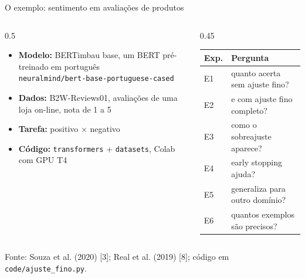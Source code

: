 \documentclass[aspectratio=169,10pt]{beamer}
\newcommand{\fonte}[1]{\par\vfill{\scriptsize\color{tinta2}Fonte: #1}}
\begin{document}
\begin{frame}{O exemplo: sentimento em avaliações de produtos}
  \begin{columns}[T]
    \begin{column}{0.5\textwidth}
      \begin{itemize}
        \item \textbf{Modelo:} BERTimbau base, um BERT pré-treinado em português\\ {\scriptsize\texttt{neuralmind/bert-base-portuguese-cased}}
        \item \textbf{Dados:} B2W-Reviews01, avaliações de uma loja on-line, nota de 1 a 5
        \item \textbf{Tarefa:} positivo × negativo
        \item \textbf{Código:} \texttt{transformers} + \texttt{datasets}, Colab com GPU T4
      \end{itemize}
    \end{column}
    \begin{column}{0.45\textwidth}
      \small
      \begin{tabular}{@{}ll@{}}
        \toprule
        \textbf{Exp.} & \textbf{Pergunta} \\
        \midrule
        E1 & quanto acerta sem ajuste fino? \\
        E2 & e com ajuste fino completo? \\
        E3 & como o sobreajuste aparece? \\
        E4 & early stopping ajuda? \\
        E5 & generaliza para outro domínio? \\
        E6 & quantos exemplos são precisos? \\
        \bottomrule
      \end{tabular}
    \end{column}
  \end{columns}
  \fonte{Souza et al. (2020) [3]; Real et al. (2019) [8]; código em \texttt{code/ajuste\_fino.py}.}
\end{frame}
\end{document}
